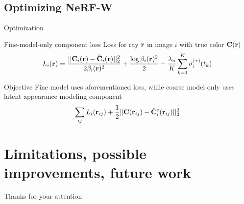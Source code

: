\documentclass[aspectratio=1610]{beamer}
\begin{document}
\subsection{Optimizing NeRF-W}
\begin{frame}{Optimization}
    \begin{block}{Fine-model-only component loss}
        Loss for ray \(\vb{r}\) in image \(i\) with true color \(\vb{C}(\vb{r})\)
        \begin{equation*}
            L_i(\vb{r}) 
            = \frac{|| \vb{C}_i (\vb{r}) - \hat{\vb{C}}_i (\vb{r}) ||_2^2}{2\beta_i (\vb{r})^2} 
            + \frac{\log \beta_i (\vb{r})^2}{2} 
            + \frac{\lambda_u}{K} \sum^K_{k=1}\sigma_i^{(\tau)} (t_k)
        \end{equation*}
    \end{block}
    \bigskip
    \begin{block}{Objective}
        Fine model uses aforementioned loss, while coarse model only uses latent appearance modeling component
        \begin{equation*}
            \sum_{ij} L_i (\vb{r}_{ij}) + \frac{1}{2} || \vb{C} (\vb{r}_{ij}) - \hat{\vb{C}}_i^c (\vb{r}_{ij}) ||^2_2 
        \end{equation*}
    \end{block}  
\end{frame}

\section{Limitations, possible improvements, future work}
\begin{frame}
    \begin{center}
        Thanks for your attention
    \end{center}
\end{frame}
\end{document}
